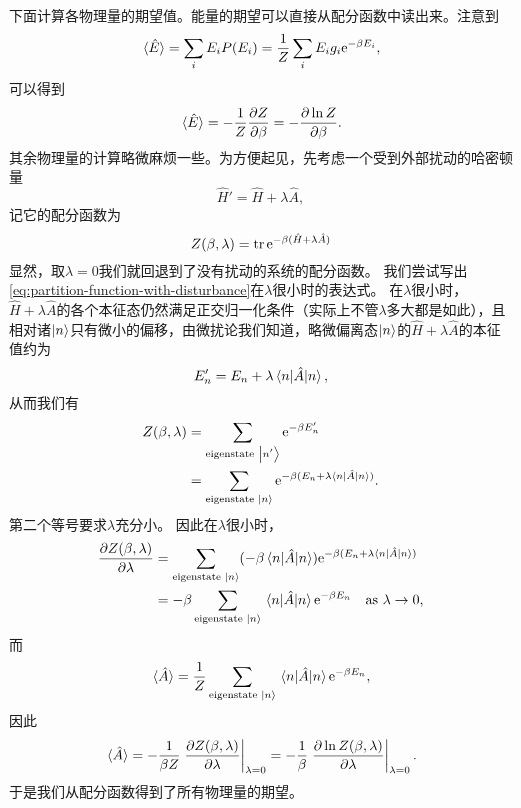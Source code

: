 \documentclass[hyperref, UTF8, a4paper]{ctexart}
\newcommand*{\ee}{\mathrm{e}}
\begin{document}
下面计算各物理量的期望值。能量的期望可以直接从配分函数中读出来。注意到
\[
    \expval*{\hat{E}} = \sum_i E_i P(E_i) = \frac{1}{Z} \sum_i E_i g_i \ee^{- \beta E_i},
\]
可以得到
\begin{equation}
    \expval*{\hat{E}} = - \frac{1}{Z} \pdv{Z}{\beta} = - \pdv{\ln Z}{\beta}.
\end{equation}
其余物理量的计算略微麻烦一些。为方便起见，先考虑一个受到外部扰动的哈密顿量
\begin{equation}
    \hat{H}' = \hat{H} + \lambda \hat{A},
\end{equation}
记它的配分函数为
\begin{equation}
    Z(\beta, \lambda) = \trace \ee^{-\beta (\hat{H} + \lambda \hat{A})}
    \label{eq:partition-function-with-disturbance}
\end{equation}
显然，取$\lambda = 0$我们就回退到了没有扰动的系统的配分函数。
我们尝试写出\eqref{eq:partition-function-with-disturbance}在$\lambda$很小时的表达式。
在$\lambda$很小时，$\hat{H} + \lambda \hat{A}$的各个本征态仍然满足正交归一化条件（实际上不管$\lambda$多大都是如此），且相对诸$\ket{n}$只有微小的偏移，由微扰论我们知道，略微偏离态$\ket{n}$的$\hat{H} + \lambda \hat{A}$的本征值约为
\[
    E'_n = E_n + \lambda \mel{n}{\hat{A}}{n},
\]
从而我们有
\[
    \begin{aligned}
        Z(\beta, \lambda) &= \sum_{\text{eigenstate $\ket{n'}$}} \ee^{- \beta E'_n} \\
        &= \sum_{\text{eigenstate $\ket{n}$}} \ee^{- \beta (E_n + \lambda \mel{n}{\hat{A}}{n})}.
    \end{aligned}
\]
第二个等号要求$\lambda$充分小。
因此在$\lambda$很小时，
\[
    \begin{aligned}
        \pdv{Z(\beta, \lambda)}{\lambda} &= \sum_{\text{eigenstate $\ket{n}$}} (-\beta \mel{n}{\hat{A}}{n}) \ee^{-\beta (E_n + \lambda \mel{n}{\hat{A}}{n})} \\
        &= - \beta \sum_{\text{eigenstate $\ket{n}$}} \mel{n}{\hat{A}}{n} \ee^{- \beta E_n} \quad \text{as $\lambda \to 0$},
    \end{aligned}
\]
而
\[
    \expval*{\hat{A}} = \frac{1}{Z} \sum_\text{eigenstate $\ket{n}$} \mel{n}{\hat{A}}{n} \ee^{- \beta E_n},
\]
因此
\begin{equation}
    \expval*{\hat{A}} = - \frac{1}{\beta Z} \eval{\pdv{Z(\beta, \lambda)}{\lambda}}_{\lambda = 0} = - \frac{1}{\beta} \eval{\pdv{\ln Z(\beta, \lambda)}{\lambda}}_{\lambda=0}.
\end{equation}
于是我们从配分函数得到了所有物理量的期望。
\end{document}
